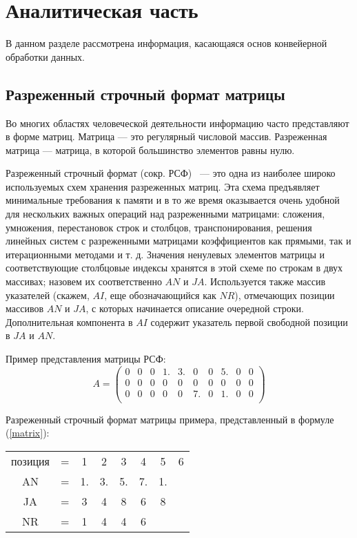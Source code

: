 \chapter{Аналитическая часть}
В данном разделе рассмотрена информация, касающаяся основ конвейерной обработки данных.

\section{Разреженный строчный формат матрицы}

Во многих областях человеческой деятельности информацию
часто представляют в форме матриц. Матрица --- это регулярный
числовой массив. Разреженная  матрица --- матрица, в которой большинство элементов равны нулю.

Разреженный строчный формат (сокр. РСФ)~\cite{csr} --- это одна из наиболее широко используемых схем хранения разреженных матриц.
Эта схема предъявляет минимальные требования к памяти и в то же
время оказывается очень удобной для нескольких важных операций над разреженными матрицами: сложения, умножения,
перестановок строк и столбцов, транспонирования, решения линейных систем с разреженными матрицами коэффициентов как
прямыми, так и итерационными методами и т. д. 
Значения ненулевых элементов матрицы и соответствующие столбцовые индексы хранятся в этой схеме по строкам в двух массивах; назовем их соответственно $AN$ и $JA$. 
Используется также массив указателей (скажем, $AI$, еще обозначающийся как $NR$), отмечающих позиции массивов $AN$ и $JA$, с которых начинается описание очередной строки. Дополнительная компонента в $AI$ содержит указатель первой свободной позиции в $JA$ и $AN$. 

Пример представления матрицы РСФ:
\begin{equation}
	\label{matrix}
	A = \begin{pmatrix}
		0 & 0 & 0 & 1. & 3. & 0 & 0 & 5. & 0 & 0 \\
		0 & 0 & 0 & 0 & 0 & 0 & 0 & 0 & 0 & 0 \\
		0 & 0 & 0 & 0 & 0 & 7. & 0 & 1. & 0 & 0 \\						
	\end{pmatrix}
\end{equation}

Разреженный строчный формат матрицы примера, представленный в  формуле (\ref{matrix}):

\begin{table}[h!]
	\begin{center}
		\begin{tabular}{c c c c c c c c}
			позиция & = & 1 & 2 & 3 & 4 & 5 & 6 \\
			AN & = & 1. & 3. & 5. & 7. & 1. & \\
			JA & = & 3 & 4 & 8 & 6 & 8 & \\
			NR & = & 1 & 4 & 4 & 6 & & \\
		\end{tabular}
	\end{center}
\end{table}

